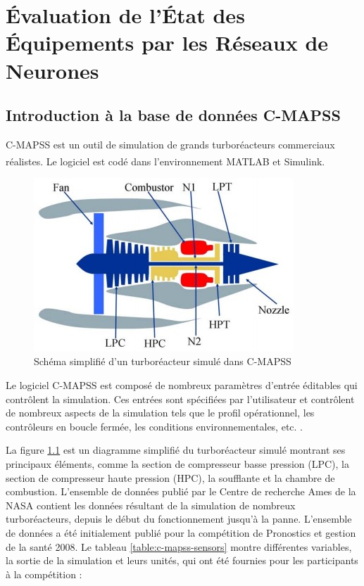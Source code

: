 \chapter{Évaluation de l'État des Équipements par les Réseaux de Neurones}
\label{chapter:equipment_state_evaluation_using_neural_networks}

\section{Introduction à la base de données C-MAPSS}

C-MAPSS est un outil de simulation de grands turboréacteurs commerciaux réalistes. Le logiciel est codé dans l'environnement MATLAB\textsuperscript{\textregistered} et Simulink\textsuperscript{\textregistered}.

\begin{figure}
    \centering
    \includegraphics[width=.48\textwidth]{figures/c-mapss-engine-diagram.jpg}
    \caption{Schéma simplifié d'un turboréacteur simulé dans C-MAPSS \cite{Saxena2008}}
    \label{figure:c-mapss-engine-diagram}    
\end{figure}

Le logiciel C-MAPSS est composé de nombreux paramètres d'entrée éditables qui contrôlent la simulation. Ces entrées sont spécifiées par l'utilisateur et contrôlent de nombreux aspects de la simulation tels que le profil opérationnel, les contrôleurs en boucle fermée, les conditions environnementales, etc. \cite{Saxena2008}. 

La figure \ref{figure:c-mapss-engine-diagram} est un diagramme simplifié du turboréacteur simulé montrant ses principaux éléments, comme la section de compresseur basse pression (LPC), la section de compresseur haute pression (HPC), la soufflante et la chambre de combustion. L'ensemble de données publié par le Centre de recherche Ames de la NASA contient les données résultant de la simulation de nombreux turboréacteurs, depuis le début du fonctionnement jusqu'à la panne. L'ensemble de données a été initialement publié pour la compétition de Pronostics et gestion de la santé 2008. Le tableau \ref{table:c-mapss-sensors} montre différentes variables, la sortie de la simulation et leurs unités, qui ont été fournies pour les participants à la compétition :

